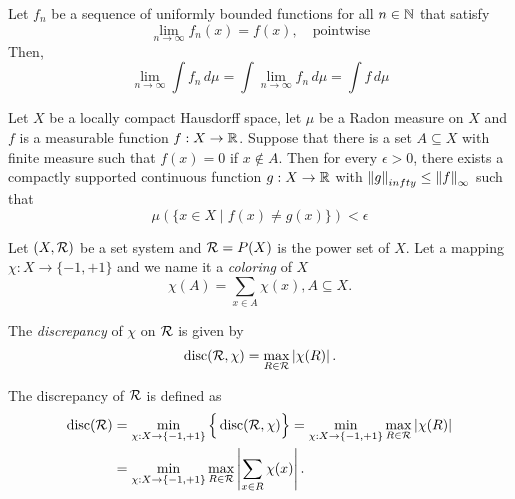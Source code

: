 \begin{theorem}
   Let $f_n$ be a sequence of uniformly bounded functions for all $n \in \mathbb{N}$
   that satisfy
   \begin{equation}
      \lim_{n\to\infty} f_n(x) = f(x), \quad \text{pointwise}
   \end{equation}
   Then, 
   \begin{equation}
      \lim_{n\to\infty}\int f_n \,d\mu = \int \lim_{n\to\infty} f_n \,d\mu = \int f \,d\mu
   \end{equation}
\end{theorem}

\begin{theorem}
   \label{thm:lusin}
   Let $X$ be a locally compact Hausdorff space, let $\mu$ be a Radon measure on
   $X$ and $f$ is a measurable function $f: X \to \mathbb{R}$. Suppose that there is a
   set $A \subseteq X$ with finite measure such that $f(x)=0$ if $x\not\in A$.
   Then for every $\epsilon >0$, there exists a compactly supported continuous
   function $g: X \to \mathbb{R}$ with $\left\| g \right\|_{infty} \leq \left\| f \right\|_{\infty}$ such that
   \begin{equation}
      \mu(\{ x\in X \mid f(x) \not= g(x) \}) < \epsilon
   \end{equation}
\end{theorem}

\begin{theorem}
   Let $(X, \mathcal{R})$ be a set system and $\mathcal{R} = P(X)$ is the power set of
   $X$. Let a mapping $\chi: X \to \{-1, +1\}$ and we name it a
   \textit{coloring} of $X$
   \begin{equation}
      \chi(A) = \sum_{x\in A} \chi(x), A \subseteq X.
   \end{equation}
   
   The \textit{discrepancy} of $\chi$ on $\mathcal{R}$ is given by 
   \begin{equation}
      \operatorname*{disc}(\mathcal{R}, \chi) = \max_{R\in \mathcal{R}} \left| \chi(R) \right|.
   \end{equation}

   The discrepancy of $\mathcal{R}$ is defined as
   \begin{align}
      \operatorname*{disc}(\mathcal{R}) 
      &= \min_{\chi: X\to\{-1,+1\}} \Big\{
         \operatorname*{disc}(\mathcal{R}, \chi)
      \Big\}
      = \min_{\chi: X\to\{-1,+1\}} \max_{R\in\mathcal{R}} \left| \chi(R) \right| \\
      &= \min_{\chi: X\to\{-1,+1\}} \max_{R\in\mathcal{R}} 
      \left| \sum_{x\in R} \chi(x) \right|.
   \end{align}
\end{theorem}

